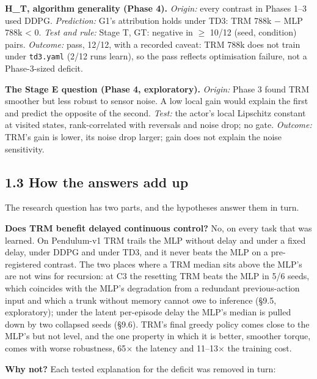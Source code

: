 \documentclass[11pt]{article}
\begin{document}
\textbf{H\_T, algorithm generality (Phase 4).} \emph{Origin:} every contrast in Phases 1--3 used DDPG. \emph{Prediction:} G1's attribution holds under TD3: TRM 788k $-$ MLP 788k < 0. \emph{Test and rule:} Stage T, GT: negative in $\geq$ 10/12 (seed, condition) pairs. \emph{Outcome:} pass, 12/12, with a recorded caveat: TRM 788k does not train under \texttt{td3.yaml} (2/12 runs learn), so the pass reflects optimisation failure, not a Phase-3-sized deficit.



\textbf{The Stage E question (Phase 4, exploratory).} \emph{Origin:} Phase 3 found TRM smoother but less robust to sensor noise. A low local gain would explain the first and predict the opposite of the second. \emph{Test:} the actor's local Lipschitz constant at visited states, rank-correlated with reversals and noise drop; no gate. \emph{Outcome:} TRM's gain is lower, its noise drop larger; gain does not explain the noise sensitivity.



\subsection*{1.3 How the answers add up}



The research question has two parts, and the hypotheses answer them in turn.



\textbf{Does TRM benefit delayed continuous control?} No, on every task that was learned. On Pendulum-v1 TRM trails the MLP without delay and under a fixed delay, under DDPG and under TD3, and it never beats the MLP on a pre-registered contrast. The two places where a TRM median sits above the MLP's are not wins for recursion: at C3 the resetting TRM beats the MLP in 5/6 seeds, which coincides with the MLP's degradation from a redundant previous-action input and which a trunk without memory cannot owe to inference (\S{}9.5, exploratory); under the latent per-episode delay the MLP's median is pulled down by two collapsed seeds (\S{}9.6). TRM's final greedy policy comes close to the MLP's but not level, and the one property in which it is better, smoother torque, comes with worse robustness, 65$\times$ the latency and 11--13$\times$ the training cost.



\textbf{Why not?} Each tested explanation for the deficit was removed in turn:
\end{document}
